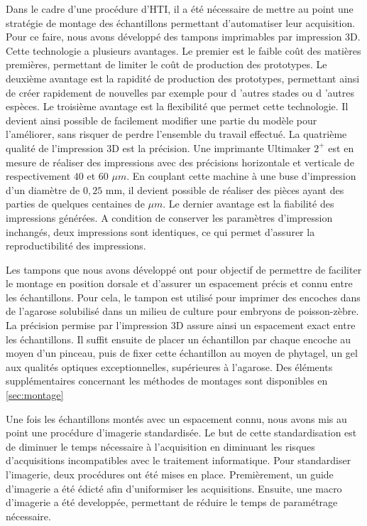 \documentclass[\main/main.tex]{subfiles}
\begin{document}
%
Dans le cadre d'une procédure d'HTI, il a été nécessaire de mettre au point une stratégie de montage des échantillons permettant d'automatiser leur acquisition.
%
Pour ce faire, nous avons développé des tampons imprimables par impression 3D.
%
Cette technologie a plusieurs avantages.
%
Le premier est le faible coût des matières premières, permettant de limiter le coût de production des prototypes.
%
Le deuxième avantage est la rapidité de production des prototypes, permettant ainsi de créer rapidement de nouvelles  par exemple pour d 'autres stades ou d 'autres espèces.
%
Le troisième avantage est la flexibilité que permet cette technologie.
%
Il devient ainsi possible de facilement modifier une partie du modèle pour l'améliorer, sans risquer de perdre l'ensemble du travail effectué.
%
La quatrième qualité de l'impression 3D est la précision.
%
Une imprimante Ultimaker $2^+$ est en mesure de réaliser des 
impressions avec des précisions horizontale et verticale de respectivement $40$ et $60$ $\mu{}m$.
%
En couplant cette machine à une buse d'impression d'un diamètre de $0,25$ mm, il devient possible de réaliser des pièces ayant des parties de quelques centaines de $\mu{}m$.
%
Le dernier avantage est la fiabilité des impressions générées.
%
A condition de conserver les paramètres d'impression inchangés, deux impressions sont identiques, ce qui permet d'assurer la reproductibilité des impressions.

\label{chapter:bio:montage}
%
Les tampons que nous avons développé ont pour objectif de permettre
de faciliter le montage en position dorsale et d'assurer un espacement
précis et connu entre les échantillons.
%
Pour cela,
le tampon est utilisé pour imprimer des encoches dans de l'agarose solubilisé dans un milieu de culture pour embryons de poisson-zèbre.
%
La précision permise par l'impression 3D assure ainsi un espacement exact entre les échantillons.
%
Il suffit ensuite de placer un échantillon par chaque encoche au moyen d'un pinceau,
puis de fixer cette échantillon au moyen de phytagel, un gel aux qualités optiques exceptionnelles, supérieures à l'agarose.
%
Des éléments supplémentaires concernant les méthodes de montages sont disponibles en \autoref{sec:montage}

%
Une fois les échantillons montés avec un espacement connu,
nous avons mis au point une procédure d'imagerie standardisée.
%
Le but de cette standardisation est de diminuer le temps nécessaire à l'acquisition
en diminuant les risques d'acquisitions incompatibles avec le traitement informatique.
%
Pour standardiser l'imagerie, deux procédures ont été mises en place.
%
Premièrement, un guide d'imagerie a été édicté afin d'uniformiser les acquisitions.
%
Ensuite, une macro d'imagerie a été developpée, permettant de réduire le temps
de paramétrage nécessaire.
\end{document}
